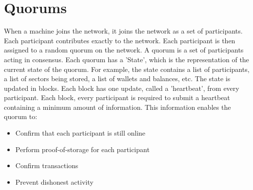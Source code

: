 \documentclass[twocolumn]{article}
\begin{document}

\section{Quorums}
When a machine joins the network, it joins the network as a set of participants.
Each participant contributes exactly \participantvolume{} to the network.
Each participant is then assigned to a random quorum on the network.
A quorum is a set of \quorumsize{} participants acting in consensus.
Each quorum has a 'State', which is the representation of the current state of the quorum.
For example, the state contains a list of participants, a list of sectors being stored, a list of wallets and balances, etc.
The state is updated in blocks.
Each block has one update, called a 'heartbeat', from every participant.
Each block, every participant is required to submit a heartbeat containing a minimum amount of information.
This information enables the quorum to:
\begin{itemize}
	\item Confirm that each participant is still online
	\item Perform proof-of-storage for each participant
	\item Confirm transactions
	\item Prevent dishonest activity
\end{itemize}
\end{document}
